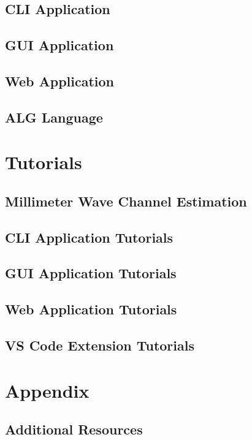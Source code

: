 \documentclass[use boldface]{beaulivre}
\begin{document}
\chapter{CLI Application}


\chapter{GUI Application}


\chapter{Web Application}


\chapter{ALG Language}


\part{Tutorials}

\chapter{Millimeter Wave Channel Estimation}


\chapter{CLI Application Tutorials}
\chapter{GUI Application Tutorials}
\chapter{Web Application Tutorials}
\chapter{VS Code Extension Tutorials}

\appendix

\cleardoublepage
\cleardoublepage
{}
{}
\part*{Appendix}
\chapter{Additional Resources}


\printbibliography[heading=bibintoc]

\turnoffhypercolor
\printindex
\end{document}
